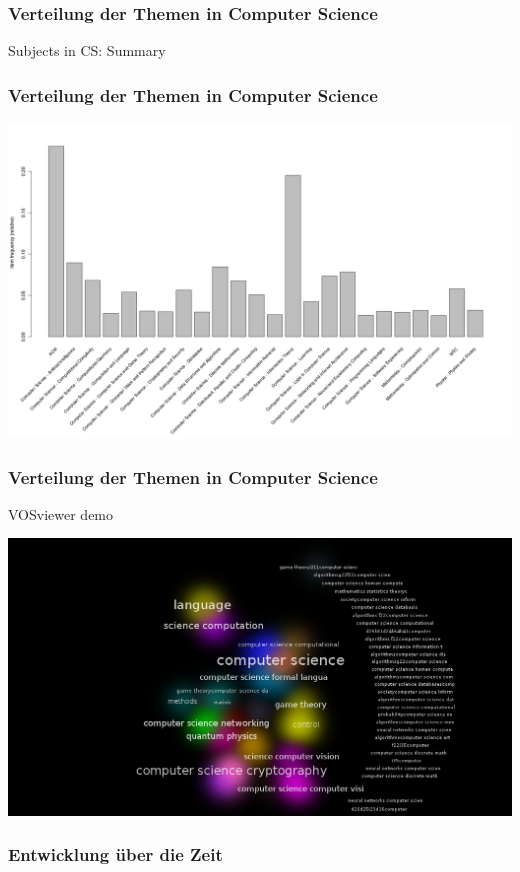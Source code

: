 \documentclass[12pt, xcolor=table]{beamer}
\begin{document}
\begin{frame}[fragile]
    \frametitle{Verteilung der Themen in Computer Science}
    \begin{block}{Subjects in CS: Summary}
    	
	\end{block}
\end{frame}

\begin{frame}
	\frametitle{Verteilung der Themen in Computer Science}
	\begin{center}
		\includegraphics[scale=0.25]{../../visual/csFrequent_filter_acm_and_msc.png}
	\end{center}
\end{frame}
\begin{frame}
	\frametitle{Verteilung der Themen in Computer Science}
    VOSviewer demo
	\begin{center}
		\includegraphics[scale=0.25]{../../visual/cs_subs_cluster_density.png}
	\end{center}
\end{frame}
\begin{frame}
	\frametitle{Entwicklung über die Zeit}
\end{frame}
\end{document}
